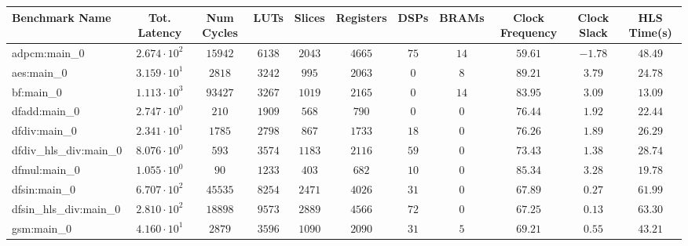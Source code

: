 \begin{tabular}{|l|c|c|c|c|c|c|c|c|c|c|}
\hline
Benchmark Name          & Tot. Latency           & Num Cycles & LUTs      & Slices    & Registers & DSPs    & BRAMs   & Clock Frequency & Clock Slack & HLS Time(s) \\
\hline
adpcm:main\_0           & $ 2.674 \cdot 10^{2} $ & $ 15942  $ & $ 6138  $ & $ 2043  $ & $ 4665  $ & $ 75  $ & $ 14  $ & $ 59.61       $ & $ -1.78   $ & $ 48.49   $ \\
aes:main\_0             & $ 3.159 \cdot 10^{1} $ & $ 2818   $ & $ 3242  $ & $ 995   $ & $ 2063  $ & $ 0   $ & $ 8   $ & $ 89.21       $ & $ 3.79    $ & $ 24.78   $ \\
bf:main\_0              & $ 1.113 \cdot 10^{3} $ & $ 93427  $ & $ 3267  $ & $ 1019  $ & $ 2165  $ & $ 0   $ & $ 14  $ & $ 83.95       $ & $ 3.09    $ & $ 13.09   $ \\
dfadd:main\_0           & $ 2.747 \cdot 10^{0} $ & $ 210    $ & $ 1909  $ & $ 568   $ & $ 790   $ & $ 0   $ & $ 0   $ & $ 76.44       $ & $ 1.92    $ & $ 22.44   $ \\
dfdiv:main\_0           & $ 2.341 \cdot 10^{1} $ & $ 1785   $ & $ 2798  $ & $ 867   $ & $ 1733  $ & $ 18  $ & $ 0   $ & $ 76.26       $ & $ 1.89    $ & $ 26.29   $ \\
dfdiv\_hls\_div:main\_0 & $ 8.076 \cdot 10^{0} $ & $ 593    $ & $ 3574  $ & $ 1183  $ & $ 2116  $ & $ 59  $ & $ 0   $ & $ 73.43       $ & $ 1.38    $ & $ 28.74   $ \\
dfmul:main\_0           & $ 1.055 \cdot 10^{0} $ & $ 90     $ & $ 1233  $ & $ 403   $ & $ 682   $ & $ 10  $ & $ 0   $ & $ 85.34       $ & $ 3.28    $ & $ 19.78   $ \\
dfsin:main\_0           & $ 6.707 \cdot 10^{2} $ & $ 45535  $ & $ 8254  $ & $ 2471  $ & $ 4026  $ & $ 31  $ & $ 0   $ & $ 67.89       $ & $ 0.27    $ & $ 61.99   $ \\
dfsin\_hls\_div:main\_0 & $ 2.810 \cdot 10^{2} $ & $ 18898  $ & $ 9573  $ & $ 2889  $ & $ 4566  $ & $ 72  $ & $ 0   $ & $ 67.25       $ & $ 0.13    $ & $ 63.30   $ \\
gsm:main\_0             & $ 4.160 \cdot 10^{1} $ & $ 2879   $ & $ 3596  $ & $ 1090  $ & $ 2090  $ & $ 31  $ & $ 5   $ & $ 69.21       $ & $ 0.55    $ & $ 43.21   $ \\

\end{tabular}
